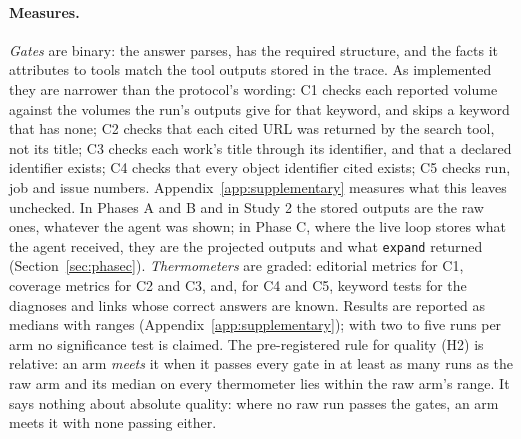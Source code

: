 \paragraph{Measures.} \emph{Gates} are binary: the answer parses, has the required structure, and the facts it
attributes to tools match the tool outputs stored in the trace. As implemented they are narrower than the
protocol's wording: C1 checks each reported volume against the volumes the run's outputs give for that keyword,
and skips a keyword that has none; C2 checks that each cited URL was returned by the search tool, not its title;
C3 checks each work's title through its identifier, and that a declared identifier exists; C4 checks that every
object identifier cited exists; C5 checks run, job and issue numbers. Appendix~\ref{app:supplementary} measures
what this leaves unchecked. In Phases A and B and in Study 2 the stored outputs are the raw ones, whatever the agent
was shown; in Phase C, where the live loop stores what the agent received, they are the projected outputs and what
\texttt{expand} returned (Section~\ref{sec:phasec}). \emph{Thermometers} are graded: editorial metrics for C1,
coverage metrics for C2 and C3, and, for C4 and C5, keyword tests for the diagnoses and links whose correct answers
are known. Results are reported as medians with ranges (Appendix~\ref{app:supplementary}); with two to five runs
per arm no significance test is claimed. The pre-registered rule for quality (H2) is relative: an arm \emph{meets}
it when it passes every gate in at least as many runs as the raw arm and its median on every thermometer lies
within the raw arm's range. It says nothing about absolute quality: where no raw run passes the gates, an arm meets
it with none passing either.
